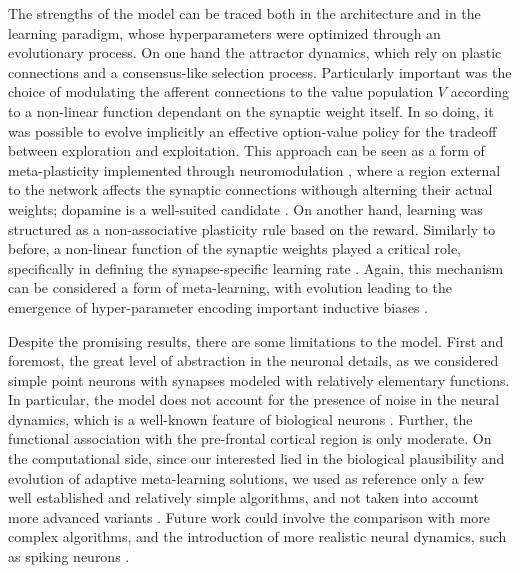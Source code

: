 The strengths of the model can be traced both in the architecture and in the learning paradigm, whose hyperparameters were optimized through an evolutionary process.
On one hand the attractor dynamics, which rely on plastic connections and a consensus-like selection process.
Particularly important was the choice of modulating the afferent connections to the value population $V$ according to a non-linear function dependant on the synaptic weight itself. In so doing, it was possible to evolve implicitly an effective option-value policy for the tradeoff between exploration and exploitation. 
This approach can be seen as a form of meta-plasticity implemented through neuromodulation \cite{wangMetalearningNaturalArtificial2021}, where a region external to the network affects the synaptic connections withough alterning their actual weights; dopamine is a well-suited candidate \cite{toblerAdaptiveCodingReward2005, roeschDopamineNeuronsEncode2007, coolsChemistryAdaptiveMind2019}.
On another hand, learning was structured as a non-associative plasticity rule based on the reward. Similarly to before, a non-linear function of the synaptic weights played a critical role, specifically in defining the synapse-specific learning rate \cite{larsenSynapsetypespecificPlasticityLocal2015}.
Again, this mechanism can be considered a form of meta-learning, with evolution leading to the emergence of hyper-parameter encoding important inductive biases \cite{inglisModulationDopamineAdaptive2021, iigayaAdaptiveLearningDecisionmaking2016}.

Despite the promising results, there are some limitations to the model. First and foremost, the great level of abstraction in the neuronal details, as we considered simple point neurons with synapses modeled with relatively elementary functions.
In particular, the model does not account for the presence of noise in the neural dynamics, which is a well-known feature of biological neurons \cite{faisalNoiseNeuronsOther2012}.
Further, the functional association with the pre-frontal cortical region is only moderate.
On the computational side, since our interested lied in the biological plausibility and evolution of adaptive meta-learning solutions, we used as reference only a few well established and relatively simple algorithms, and not taken into account more advanced variants \cite{tokicAdaptiveEGreedyExploration2010, tokicValueDifferenceBasedExploration2011}.
Future work could involve the comparison with more complex algorithms, and the introduction of more realistic neural dynamics, such as spiking neurons \cite{nunesSpikingNeuralNetworks2022}.


